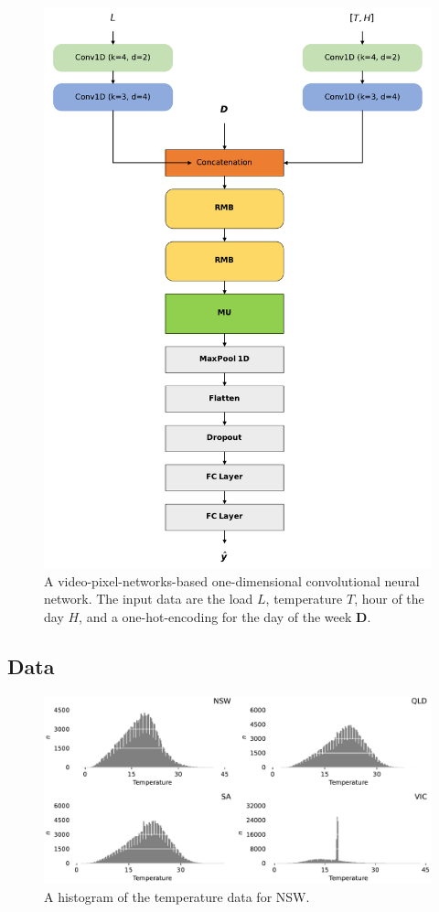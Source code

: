 \documentclass[mstat,12pt]{unswthesis}
\begin{document}
\begin{figure}[H]
\centerline{\includegraphics[width=0.9\columnwidth]{Figures/Diagrams/1D-CNN.pdf}}
\caption{A video-pixel-networks-based one-dimensional convolutional neural network. The input data are the load $L$, temperature $T$, hour of the day $H$, and a one-hot-encoding for the day of the week $\boldsymbol{D}$.}
\label{1D-CNN}
\end{figure}

\hypertarget{data}{\subsection{Data}\label{data}}

\renewcommand*\thetable{\arabic{table}} %
 \metadata

\begin{figure}[H]
\centerline{\includegraphics[width=0.8\columnwidth]{Figures/Plots/Temperature histogram.pdf}}
\caption{A histogram of the temperature data for NSW.}
\label{temp}
\end{figure}
\end{document}
